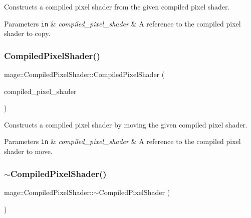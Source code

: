 Constructs a compiled pixel shader from the given compiled pixel shader.


\begin{DoxyParams}[1]{Parameters}
\mbox{\tt in}  & {\em compiled\+\_\+pixel\+\_\+shader} & A reference to the compiled pixel shader to copy. \\
\hline
\end{DoxyParams}
\hypertarget{structmage_1_1_compiled_pixel_shader_a512dada64de6fa3ebf31a096da80904d}{}\label{structmage_1_1_compiled_pixel_shader_a512dada64de6fa3ebf31a096da80904d} 
\subsubsection{\texorpdfstring{Compiled\+Pixel\+Shader()}{CompiledPixelShader()}\hspace{0.1cm}{\footnotesize\ttfamily [4/4]}}
{\footnotesize\ttfamily mage\+::\+Compiled\+Pixel\+Shader\+::\+Compiled\+Pixel\+Shader (\begin{DoxyParamCaption}\item[{\hyperlink{structmage_1_1_compiled_pixel_shader}{Compiled\+Pixel\+Shader} \&\&}]{compiled\+\_\+pixel\+\_\+shader }\end{DoxyParamCaption})\hspace{0.3cm}{\ttfamily [default]}}

Constructs a compiled pixel shader by moving the given compiled pixel shader.


\begin{DoxyParams}[1]{Parameters}
\mbox{\tt in}  & {\em compiled\+\_\+pixel\+\_\+shader} & A reference to the compiled pixel shader to move. \\
\hline
\end{DoxyParams}
\hypertarget{structmage_1_1_compiled_pixel_shader_a2121a916b6b1fe1b36aadb136f6b4219}{}\label{structmage_1_1_compiled_pixel_shader_a2121a916b6b1fe1b36aadb136f6b4219} 
\subsubsection{\texorpdfstring{$\sim$\+Compiled\+Pixel\+Shader()}{~CompiledPixelShader()}}
{\footnotesize\ttfamily mage\+::\+Compiled\+Pixel\+Shader\+::$\sim$\+Compiled\+Pixel\+Shader (\begin{DoxyParamCaption}{ }\end{DoxyParamCaption})\hspace{0.3cm}{\ttfamily [default]}}

